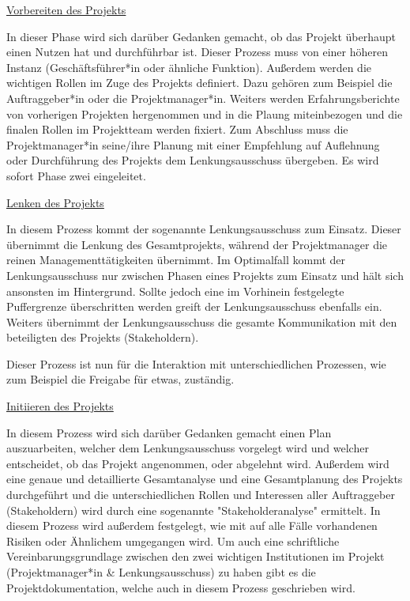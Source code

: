 \underline{Vorbereiten des Projekts}

In dieser Phase wird sich darüber Gedanken gemacht, ob das Projekt überhaupt einen Nutzen hat und durchführbar ist. Dieser Prozess muss von einer höheren Instanz (Geschäftsführer*in oder ähnliche Funktion). Außerdem werden die wichtigen Rollen im Zuge des Projekts definiert. Dazu gehören zum Beispiel die Auftraggeber*in oder die Projektmanager*in. Weiters werden Erfahrungsberichte von vorherigen Projekten hergenommen und in die Plaung miteinbezogen und die finalen Rollen im Projektteam werden fixiert. Zum Abschluss muss die Projektmanager*in seine/ihre Planung mit einer Empfehlung auf Auflehnung oder Durchführung des Projekts dem Lenkungsausschuss übergeben. Es wird sofort Phase zwei eingeleitet. \cite{Prince2}

\pagebreak
\underline{Lenken des Projekts}

In diesem Prozess kommt der sogenannte Lenkungsausschuss zum Einsatz. Dieser übernimmt die Lenkung des Gesamtprojekts, während der Projektmanager die reinen Managementtätigkeiten übernimmt. Im Optimalfall kommt der Lenkungsausschuss nur zwischen Phasen eines Projekts zum Einsatz und hält sich ansonsten im Hintergrund. Sollte jedoch eine im Vorhinein festgelegte Puffergrenze überschritten werden greift der Lenkungsausschuss ebenfalls ein. Weiters übernimmt der Lenkungsausschuss die gesamte Kommunikation mit den beteiligten des Projekts (Stakeholdern). \cite{Prince2}

Dieser Prozess ist nun für die Interaktion mit unterschiedlichen Prozessen, wie zum Beispiel die Freigabe für etwas, zuständig. \cite{Prince2}

\underline{Initiieren des Projekts}

In diesem Prozess wird sich darüber Gedanken gemacht einen Plan auszuarbeiten, welcher dem Lenkungsausschuss vorgelegt wird und welcher entscheidet, ob das Projekt angenommen, oder abgelehnt wird. Außerdem wird eine genaue und detaillierte Gesamtanalyse und eine Gesamtplanung des Projekts durchgeführt und die unterschiedlichen Rollen und Interessen aller Auftraggeber (Stakeholdern) wird durch eine sogenannte "Stakeholderanalyse" ermittelt. In diesem Prozess wird außerdem festgelegt, wie mit auf alle Fälle vorhandenen Risiken oder Ähnlichem umgegangen wird. Um auch eine schriftliche Vereinbarungsgrundlage zwischen den zwei wichtigen Institutionen im Projekt (Projektmanager*in \& Lenkungsausschuss) zu haben gibt es die Projektdokumentation, welche auch in diesem Prozess geschrieben wird. \cite{Prince2} \cite{Stakeholder}


